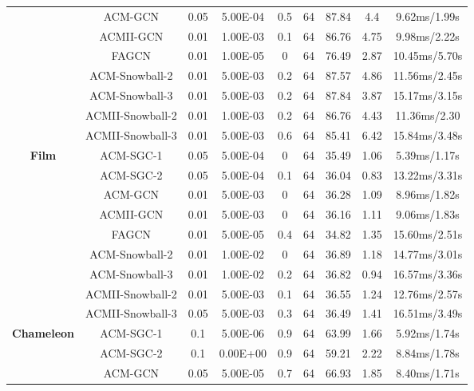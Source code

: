 \documentclass{article}
\newcommand{\0}{{\boldsymbol{0}}}
\newcommand{\6}{{\partial}}
\newcommand{\8}{{\infty}}
\newcommand{\4}{{\nabla}}
\begin{document}
\begin{table}[htbp]
{\begin{tabular}{c|c|ccccccc}
          & ACM-GCN & 0.05  & 5.00E-04 & 0.5   & 64    & 87.84 & 4.4   & 9.62ms/1.99s \\
          & ACMII-GCN & 0.01  & 1.00E-03 & 0.1   & 64    & 86.76 & 4.75  & 9.98ms/2.22s \\
          & FAGCN & 0.01  & 1.00E-05 & 0     & 64    & 76.49 & \textcolor[rgb]{ .267,  .267,  .267}{2.87} & 10.45ms/5.70s \\
          & ACM-Snowball-2 & 0.01  & 5.00E-03 & 0.2   & 64    & 87.57 & 4.86  & 11.56ms/2.45s \\
          & ACM-Snowball-3 & 0.01  & 5.00E-03 & 0.2   & 64    & 87.84 & 3.87  & 15.17ms/3.15s \\
          & ACMII-Snowball-2 & 0.01  & 1.00E-03 & 0.2   & 64    & 86.76 & 4.43  & 11.36ms/2.30 \\
          & ACMII-Snowball-3 & 0.01  & 5.00E-03 & 0.6   & 64    & 85.41 & 6.42  & 15.84ms/3.48s \\
           \midrule
    \multirow{9}[0]{*}{\textbf{Film}} & ACM-SGC-1 & 0.05  & 5.00E-04 & 0     & 64    & 35.49 & 1.06  & 5.39ms/1.17s \\
          & ACM-SGC-2 & 0.05  & 5.00E-04 & 0.1   & 64    & 36.04 & 0.83  & 13.22ms/3.31s \\
          & ACM-GCN & 0.01  & 5.00E-03 & 0     & 64    & 36.28 & 1.09  & 8.96ms/1.82s \\
          & ACMII-GCN & 0.01  & 5.00E-03 & 0     & 64    & 36.16 & 1.11  & 9.06ms/1.83s \\
          & FAGCN & 0.01  & 5.00E-05 & 0.4   & 64    & 34.82 & 1.35  & 15.60ms/2.51s \\
          & ACM-Snowball-2 & 0.01  & 1.00E-02 & 0     & 64    & 36.89 & 1.18  & 14.77ms/3.01s \\
          & ACM-Snowball-3 & 0.01  & 1.00E-02 & 0.2   & 64    & 36.82 & 0.94  & 16.57ms/3.36s \\
          & ACMII-Snowball-2 & 0.01  & 5.00E-03 & 0.1   & 64    & 36.55 & 1.24  & 12.76ms/2.57s \\
          & ACMII-Snowball-3 & 0.05  & 5.00E-03 & 0.3   & 64    & 36.49 & 1.41  & 16.51ms/3.49s \\
           \midrule
    \multirow{9}[0]{*}{\textbf{Chameleon}} & ACM-SGC-1 & 0.1   & 5.00E-06 & 0.9   & 64    & 63.99 & 1.66  & 5.92ms/1.74s \\
          & ACM-SGC-2 & 0.1   & 0.00E+00 & 0.9   & 64    & 59.21 & 2.22  & 8.84ms/1.78s \\
          & ACM-GCN & 0.05  & 5.00E-05 & 0.7   & 64    & 66.93 & 1.85  & 8.40ms/1.71s \\

\end{tabular}}
\end{table}
\end{document}
